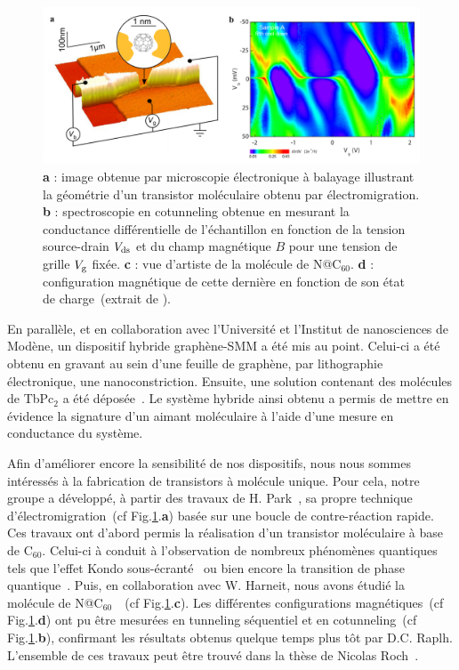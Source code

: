 \begin{figure}
\centering \includegraphics[scale=0.45]{Spintronique/RochC60/RochC60.pdf}
\caption{\textbf{a} : image obtenue par microscopie électronique à balayage illustrant la géométrie d'un transistor moléculaire obtenu par électromigration. \textbf{b} : spectroscopie en cotunneling obtenue en mesurant la conductance différentielle de l'échantillon en fonction de la tension source-drain $V_{\rm{ds}}$ et du champ magnétique $B$ pour une tension de grille $V_{\rm{g}}$ fixée. \textbf{c} : vue d'artiste de la molécule de N@C$_{60}$. \textbf{d} : configuration magnétique de cette dernière en fonction de son état de charge~(extrait de \cite{Roch2011}).}
\label{RochC60}
\end{figure}

En parallèle, et en collaboration avec l'Université et l'Institut de nanosciences de Modène, un dispositif hybride graphène-SMM a été mis au point. Celui-ci a été obtenu en gravant au sein d'une feuille de graphène, par lithographie électronique, une nanoconstriction. Ensuite, une solution contenant des molécules de TbPc$_{2}$ a été déposée~\cite{Candini2011}. Le système hybride ainsi obtenu a permis de mettre en évidence la signature d'un aimant moléculaire à l'aide d'une mesure en conductance du système.

Afin d'améliorer encore la sensibilité de nos dispositifs, nous nous sommes intéressés à la fabrication de transistors à molécule unique. Pour cela, notre groupe a développé, à partir des travaux de H. Park~\cite{Park1999}, sa propre technique d'électromigration~(cf Fig.\ref{RochC60}.\textbf{a}) basée sur une boucle de contre-réaction rapide. Ces travaux ont d'abord permis la réalisation d'un transistor moléculaire à base de C$_{60}$. Celui-ci à conduit à l'observation de nombreux phénomènes quantiques tels que l'effet Kondo sous-écranté~\cite{Roch2009} ou bien encore la transition de phase quantique~\cite{Roch2008}. Puis, en collaboration avec W. Harneit, nous avons étudié la molécule de N@C$_{60}$~\cite{Roch2011}~(cf Fig.\ref{RochC60}.\textbf{c}). Les différentes configurations magnétiques~(cf Fig.\ref{RochC60}.\textbf{d}) ont pu \^etre mesurées en tunneling séquentiel et en cotunneling~(cf Fig.\ref{RochC60}.\textbf{b}), confirmant les résultats obtenus quelque temps plus tôt par D.C. Raplh. L'ensemble de ces travaux peut être trouvé dans la thèse de Nicolas Roch~\cite{RochPhd}.

